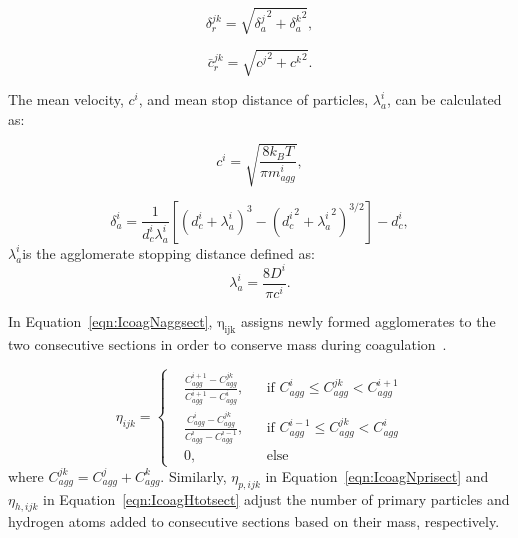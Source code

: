 \begin{equation}
	\delta^{jk}_r=
	\sqrt{
		{\delta^j_a}^2+{\delta^k_a}^2
	}
	\label{eqn:sqrtmeandist},
\end{equation}

\begin{equation}
	\bar{c}^{jk}_r=
	\sqrt{
		{c^j}^2+{c^k}^2
	}
	\label{eqn:sqrtmeanvel}.
\end{equation}

The mean velocity, ${c^i}$, and mean stop distance of particles, ${\lambda^i_a}$, can be calculated as:

\begin{equation}
	c^i = \sqrt{\frac{8k_B T}{\pi m^i_{agg}}},
	\label{eqn:meanvel}
\end{equation}

\begin{equation}
	\delta^i_a=\frac{1}{d^i_c\lambda^i_a}
	\left[
	\left(
	d^i_c+\lambda^i_a
	\right)^3
	-\left(
	{d^i_c}^2+{\lambda^i_a}^2
	\right)^{3 / 2}
	\right]
	-d^i_{c},
	\label{eqn:meandist}
\end{equation}
\noindent $\lambda^i_a $is the agglomerate stopping distance defined as:
\begin{equation}
	\lambda^i_a = \frac{8D^i}{\pi c^i}
	\label{eqn:stopdist}.
\end{equation}




In Equation~\eqref{eqn:IcoagNaggsect}, $\mathrm{\eta_{ijk}}$ assigns newly formed agglomerates to the two consecutive sections in order to conserve mass during coagulation~\citep{park2005aerosol}.

\begin{equation}
	\eta_{ijk}=
	\left\{
	\begin{aligned}
		&\frac{C^{i+1}_{agg}-C^{jk}_{agg}}{C^{i+1}_{agg}-C^i_{agg}},
		&&
		\text{if } C^i_{agg} \le C^{jk}_{agg} < C^{i+1}_{agg}
		\\
		&\frac{C^{i}_{agg}-C^{jk}_{agg}}{C^{i}_{agg}-C^{i-1}_{agg}}, 
		&&
		\text{if } C^{i-1}_{agg} \le C^{jk}_{agg} < C^{i}_{agg}
		\\
		&0,
		&&\text{else}
	\end{aligned}
	\right.
	\label{eqn:etacoag}
\end{equation}
\noindent where ${C^{jk}_{agg}=C^{j}_{agg}+C^{k}_{agg}}$. Similarly, $\eta_{p,ijk}$ in Equation~\eqref{eqn:IcoagNprisect} and $\eta_{h,ijk}$ in Equation~\eqref{eqn:IcoagHtotsect} adjust the number of primary particles and hydrogen atoms added to consecutive sections based on their mass, respectively.


